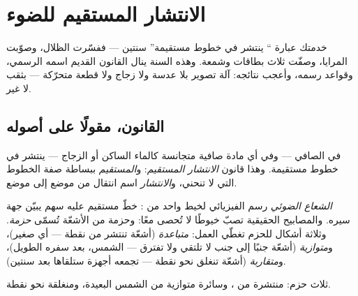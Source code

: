 \chapter{الانتشار المستقيم للضوء}\label{ch:g6:light-propagation}

خدمتك عبارة `` ينتشر في خطوط مستقيمة'' سنتين --- ففسّرت
الظلال، وصوّبت المرايا، وصفّت ثلاث بطاقات وشمعة. وهذه السنة ينال
القانون القديم اسمه الرسمي، وقواعد رسمه، وأعجب نتائجه: آلة تصوير
بلا عدسة ولا زجاج ولا قطعة متحرّكة --- بثقب لا غير.

\section{القانون، مقولًا على أصوله}

\begin{proposition}\label{prop:g6:light-propagation:law}
في  الصافي --- وفي أي مادة صافية متجانسة كالماء الساكن أو
الزجاج --- ينتشر  في خطوط مستقيمة. وهذا قانون
\emph{الانتشار المستقيم}: و\emph{المستقيم}
ببساطة صفة الخطوط التي لا تنحني، و\emph{الانتشار} اسم انتقال
 من موضع إلى موضع.
\end{proposition}

\begin{definition}\label{def:g6:light-propagation:ray}
\emph{الشعاع الضوئي} رسم الفيزيائي لخيط واحد من
: خطّ مستقيم عليه سهم يبيّن جهة سيره. والمصابيح الحقيقية
تصبّ خيوطًا لا تُحصى معًا: وحزمة من الأشعّة تُسمّى
\emph{حزمة}. وثلاثة أشكال للحزم تغطّي العمل:
\emph{متباعدة} (أشعّة تنتشر من نقطة --- أي  صغير)،
و\emph{متوازية} (أشعّة جنبًا إلى جنب لا تلتقي ولا تفترق --- 
الشمس، بعد سفره الطويل)، و\emph{متقاربة} (أشعّة تنغلق نحو نقطة
---  تجمعه أجهزة ستلقاها بعد سنتين).
\end{definition}

\begin{omfigure}

{\small ثلاث حزم: منتشرة من ، وسائرة متوازية من الشمس
البعيدة، ومنغلقة نحو نقطة.}
\end{omfigure}

